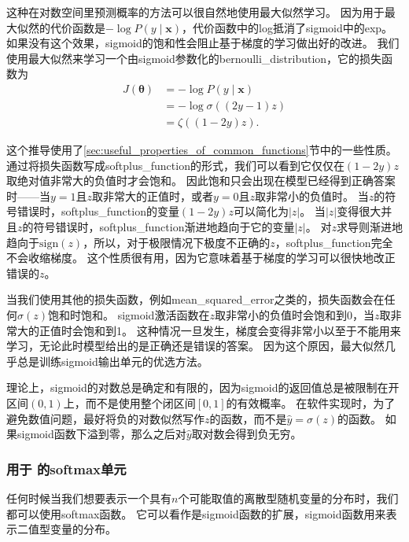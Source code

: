 
这种在对数空间里预测概率的方法可以很自然地使用最大似然学习。
因为用于最大似然的代价函数是$-\log P(y\mid\bm{x})$，代价函数中的log抵消了\gls{sigmoid}中的exp。
如果没有这个效果，\gls{sigmoid}的饱和性会阻止基于梯度的学习做出好的改进。
我们使用最大似然来学习一个由\gls{sigmoid}参数化的\gls{bernoulli_distribution}，它的损失函数为
\begin{align}
J(\bm{\theta}) &= -\log P(y\mid\bm{x})\\
&= -\log \sigma ((2y-1)z)\\
&= \zeta((1-2y)z).
\end{align}

这个推导使用了\ref{sec:useful_properties_of_common_functions}节中的一些性质。
通过将损失函数写成\gls{softplus_function}的形式，我们可以看到它仅仅在$(1-2y)z$取绝对值非常大的负值时才会饱和。
因此饱和只会出现在模型已经得到正确答案时——当$y=1$且$z$取非常大的正值时，或者$y=0$且$z$取非常小的负值时。
当$z$的符号错误时，\gls{softplus_function}的变量$(1-2y)z$可以简化为$|z|$。
当$|z|$变得很大并且$z$的符号错误时，\gls{softplus_function}渐进地趋向于它的变量$|z|$。
对$z$求导则渐进地趋向于$\text{sign}(z)$，所以，对于极限情况下极度不正确的$z$，\gls{softplus_function}完全不会收缩梯度。
这个性质很有用，因为它意味着基于梯度的学习可以很快地改正错误的$z$。

当我们使用其他的损失函数，例如\gls{mean_squared_error}之类的，损失函数会在任何$\sigma(z)$饱和时饱和。
\gls{sigmoid}激活函数在$z$取非常小的负值时会饱和到0，当$z$取非常大的正值时会饱和到1。
这种情况一旦发生，梯度会变得非常小以至于不能用来学习，无论此时模型给出的是正确还是错误的答案。
因为这个原因，最大似然几乎总是训练\gls{sigmoid}输出单元的优选方法。

理论上，\gls{sigmoid}的对数总是确定和有限的，因为\gls{sigmoid}的返回值总是被限制在开区间$(0, 1)$上，而不是使用整个闭区间$[0, 1]$的有效概率。
在软件实现时，为了避免数值问题，最好将负的对数似然写作$z$的函数，而不是$\hat{y}=\sigma(z)$的函数。
如果\gls{sigmoid}函数下溢到零，那么之后对$\hat{y}$取对数会得到负无穷。

\subsubsection{用于
的softmax单元}
\label{sec:softmax_units_for_multinoulli_output_distributions}

任何时候当我们想要表示一个具有$n$个可能取值的离散型随机变量的分布时，我们都可以使用softmax函数。
它可以看作是\gls{sigmoid}函数的扩展，\gls{sigmoid}函数用来表示二值型变量的分布。

